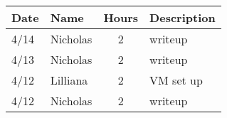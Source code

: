 \begin{tabular}{l l c p{1.1in}}\textbf{Date} & \textbf{Name} & \textbf{Hours} & \textbf{Description}\\\hline
4/14 & Nicholas & 2 & writeup\\\hline
4/13 & Nicholas & 2 & writeup\\\hline
4/12 & Lilliana & 2 & VM set up\\\hline
4/12 & Nicholas & 2 & writeup\\\hline
\end{tabular}